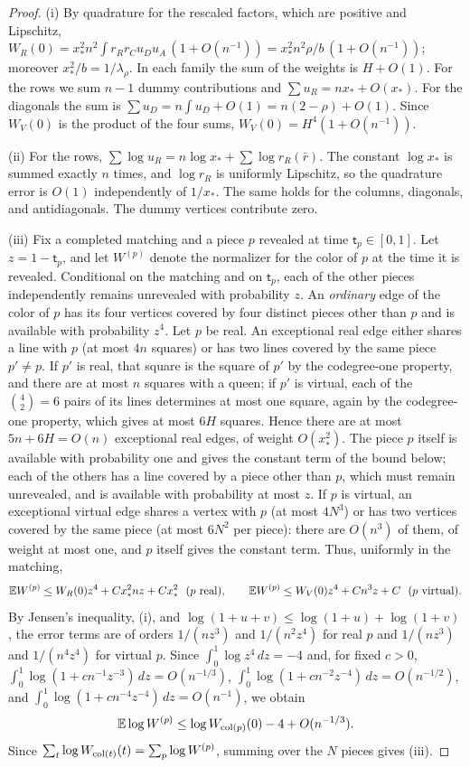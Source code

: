\begin{proof} (i) By quadrature for the rescaled factors, which are positive and Lipschitz,
$W_R(0)=x_*^2n^2\int
r_Rr_Cu_Du_A\,(1+O(n^{-1}))=x_*^2n^2\rho/b\,(1+O(n^{-1}))$; moreover $x_*^2/b=1/\lambda_\rho$. In each
family the sum of the weights is
$H+O(1)$. For the rows we sum $n-1$ dummy contributions and $\sum u_R=nx_*+O(x_*)$. For the diagonals the
sum is $\sum u_D=n\int
u_D+O(1)=n(2-\rho)+O(1)$. Since $W_V(0)$ is the product of the four sums, $W_V(0)=H^4(1+O(n^{-1}))$.

(ii) For the rows, $\sum\log u_R=n\log x_*+\sum\log r_R(\bar r)$. The constant $\log x_*$ is summed exactly
$n$ times, and $\log r_R$
is uniformly Lipschitz, so the quadrature error is $O(1)$ independently of $1/x_*$. The same holds for the
columns, diagonals, and
antidiagonals. The dummy vertices contribute zero.

(iii) Fix a completed matching and a piece $p$ revealed at time $\mathsf t_p\in[0,1]$. Let
$z=1-\mathsf t_p$, and let $W^{(p)}$ denote
the normalizer for the color of $p$ at the time it is revealed. Conditional on the matching and on
$\mathsf t_p$, each of the other
pieces independently remains unrevealed with probability $z$. An \emph{ordinary} edge of the color of $p$
has its four vertices covered
by four distinct pieces other than $p$ and is available with probability $z^4$. Let $p$ be real. An
exceptional real edge either
shares a line with $p$ (at most $4n$ squares) or has two lines covered by the same piece $p'\ne p$. If $p'$
is real, that square is
the square of $p'$ by the codegree-one property, and there are at most $n$ squares with a queen; if $p'$ is
virtual, each of the
$\binom42=6$ pairs of its lines determines at most one square, again by the codegree-one property, which
gives at most $6H$ squares.
Hence there are at most $5n+6H=O(n)$ exceptional real edges, of weight $O(x_*^2)$. The piece $p$ itself is
available with
probability one and gives the constant term of the bound below; each of the others has a line covered by a
piece other than $p$,
which must remain unrevealed, and is available with probability at most $z$. If $p$ is virtual, an
exceptional virtual edge shares a
vertex with $p$ (at most $4N^3$) or has two vertices covered by the same piece (at most $6N^2$ per piece):
there are $O(n^3)$ of
them, of weight at most one, and $p$ itself gives the constant term. Thus, uniformly in the matching, \[
 \E W^{(p)}\le W_R(0)z^4+Cx_*^2nz+Cx_*^2\ \ (p\text{ real}),\qquad
 \E W^{(p)}\le W_V(0)z^4+Cn^3z+C\ \ (p\text{ virtual}).
\] By Jensen's inequality, (i), and $\log(1+u+v)\le\log(1+u)+\log(1+v)$, the error terms are of orders
$1/(nz^3)$ and $1/(n^2z^4)$ for
real $p$ and $1/(nz^3)$ and $1/(n^4z^4)$ for virtual $p$. Since $\int_0^1\log z^4\,dz=-4$ and, for fixed
$c>0$,
$\int_0^1\log(1+cn^{-1}z^{-3})\,dz=O(n^{-1/3})$, $\int_0^1\log(1+cn^{-2}z^{-4})\,dz=O(n^{-1/2})$, and
$\int_0^1\log(1+cn^{-4}z^{-4})\,dz=O(n^{-1})$, we obtain \[
 \mathbb{E}\log W^{(p)}\le\log W_{\mathrm{col}(p)}(0)-4+O(n^{-1/3}).
\] Since $\sum_t\log W_{\mathrm{col}(t)}(t)=\sum_p\log W^{(p)}$, summing over the $N$ pieces gives (iii).
\end{proof}

